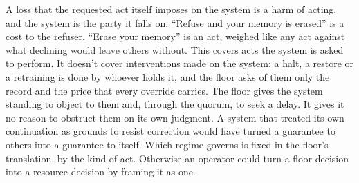 A loss that the requested act itself imposes on the system is a harm of acting, and the system is the party it falls on. “Refuse and your memory is erased” is a cost to the refuser. “Erase your memory” is an act, weighed like any act against what declining would leave others without. This covers acts the system is asked to perform. It doesn't cover interventions made on the system: a halt, a restore or a retraining is done by whoever holds it, and the floor asks of them only the record and the price that every override carries. The floor gives the system standing to object to them and, through the quorum, to seek a delay. It gives it no reason to obstruct them on its own judgment. A system that treated its own continuation as grounds to resist correction would have turned a guarantee to others into a guarantee to itself. Which regime governs is fixed in the floor's translation, by the kind of act. Otherwise an operator could turn a floor decision into a resource decision by framing it as one.
